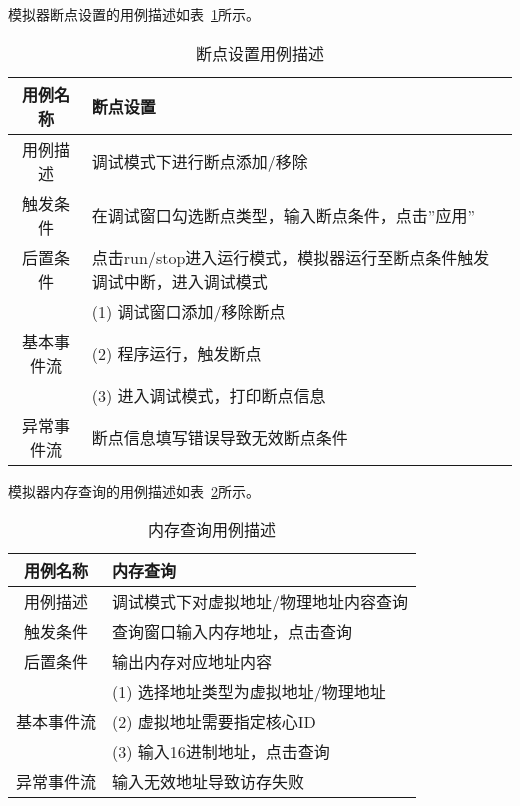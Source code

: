 模拟器断点设置的用例描述如表~\ref{tab:yongli3}所示。
\begin{table}[H]
  \centering
  \caption{断点设置用例描述}
  \label{tab:yongli3}
  \renewcommand\arraystretch{1.1}
  \begin{tabular}{cl}
    \toprule
用例名称	& 断点设置\\
    \midrule
用例描述	& \multicolumn{1}{p{9cm}}{调试模式下进行断点添加/移除}\\ \hline
触发条件	& \multicolumn{1}{m{9cm}}{在调试窗口勾选断点类型，输入断点条件，点击”应用”}\\ \hline
后置条件	& \multicolumn{1}{m{9cm}}{点击run/stop进入运行模式，模拟器运行至断点条件触发调试中断，进入调试模式}\\ \hline
 & \multicolumn{1}{m{9cm}}{(1)	调试窗口添加/移除断点}\\
 基本事件流 & \multicolumn{1}{m{9cm}}{(2)	程序运行，触发断点}\\
 & \multicolumn{1}{m{9cm}}{(3)	进入调试模式，打印断点信息}\\ \hline
异常事件流	& \multicolumn{1}{m{9cm}}{断点信息填写错误导致无效断点条件}\\
    \bottomrule
  \end{tabular}
\end{table}


模拟器内存查询的用例描述如表~\ref{tab:yongli4}所示。
\begin{table}[H]
  \centering
  \caption{内存查询用例描述}
  \label{tab:yongli4}
  \renewcommand\arraystretch{1.1}
  \begin{tabular}{cl}
    \toprule
用例名称	& 内存查询\\
    \midrule
用例描述	& \multicolumn{1}{p{9cm}}{调试模式下对虚拟地址/物理地址内容查询}\\ \hline
触发条件	& \multicolumn{1}{p{9cm}}{查询窗口输入内存地址，点击查询}\\ \hline
后置条件	& \multicolumn{1}{p{9cm}}{输出内存对应地址内容}\\ \hline
	& \multicolumn{1}{p{9cm}}{(1) 选择地址类型为虚拟地址/物理地址}\\
  基本事件流 &            \multicolumn{1}{p{9cm}}{(2) 虚拟地址需要指定核心ID}\\
 &            \multicolumn{1}{p{9cm}}{(3) 输入16进制地址，点击查询}\\ \hline
异常事件流	& \multicolumn{1}{p{9cm}}{输入无效地址导致访存失败}\\
    \bottomrule
  \end{tabular}
\end{table}


